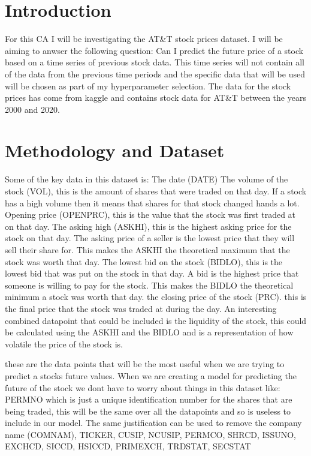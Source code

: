 \documentclass{report}
\begin{document}
\section{Introduction}
For this CA I will be investigating the AT\&T stock prices dataset.
I will be aiming to anwser the following question: Can I predict the future price of a stock based on a time series of previous stock data.
This time series will not contain all of the data from the previous time periods and the specific data that will be used will be chosen as part of my hyperparameter selection.
The data for the stock prices has come from kaggle and contains stock data for AT\&T between the years 2000 and 2020.

\section{Methodology and Dataset}
Some of the key data in this dataset is: The date (DATE)
The volume of the stock (VOL), this is the amount of shares that were traded on that day. If a stock has a high volume then it means that shares for that stock changed hands a lot.
Opening price (OPENPRC), this is the value that the stock was first traded at on that day.
The asking high (ASKHI), this is the highest asking price for the stock on that day. The asking price of a seller is the lowest price that they will sell their share for. This makes the ASKHI the theoretical maximum that the stock was worth that day.
The lowest bid on the stock (BIDLO), this is the lowest bid that was put on the stock in that day. A bid is the highest price that someone is willing to pay for the stock. This makes the BIDLO the theoretical minimum a stock was worth that day.
the closing price of the stock (PRC). this is the final price that the stock was traded at during the day.
An interesting combined datapoint that could be included is the liquidity of the stock, this could be calculated using the ASKHI and the BIDLO and is a representation of how volatile the price of the stock is.

these are the data points that will be the most useful when we are trying to predict a stocks future values.
When we are creating a model for predicting the future of the stock we dont have to worry about things in this dataset like:
PERMNO which is just a unique identification number for the shares that are being traded, this will be the same over all the datapoints and so is useless to include in our model.
The same justification can be used to remove the company name (COMNAM), TICKER, CUSIP, NCUSIP, PERMCO, SHRCD, ISSUNO, EXCHCD, SICCD, HSICCD, PRIMEXCH, TRDSTAT, SECSTAT
\end{document}
